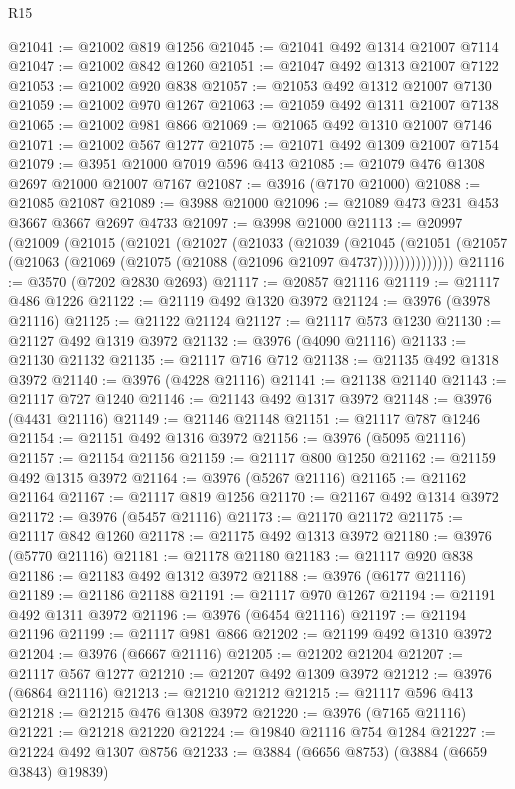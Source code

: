 \begin{lexlean}{R15}
\begin{coremodule}
@21041 := @21002 @819 @1256
@21045 := @21041 @492 @1314 @21007 @7114
@21047 := @21002 @842 @1260
@21051 := @21047 @492 @1313 @21007 @7122
@21053 := @21002 @920 @838
@21057 := @21053 @492 @1312 @21007 @7130
@21059 := @21002 @970 @1267
@21063 := @21059 @492 @1311 @21007 @7138
@21065 := @21002 @981 @866
@21069 := @21065 @492 @1310 @21007 @7146
@21071 := @21002 @567 @1277
@21075 := @21071 @492 @1309 @21007 @7154
@21079 := @3951 @21000 @7019 @596 @413
@21085 := @21079 @476 @1308 @2697 @21000 @21007 @7167
@21087 := @3916 (@7170 @21000)
@21088 := @21085 @21087
@21089 := @3988 @21000
@21096 := @21089 @473 @231 @453 @3667 @3667 @2697 @4733
@21097 := @3998 @21000
@21113 := @20997
    (@21009
      (@21015
        (@21021
          (@21027
            (@21033
              (@21039
                (@21045
                  (@21051 (@21057 (@21063 (@21069 (@21075 (@21088 (@21096 @21097 @4737))))))))))))))
@21116 := @3570 (@7202 @2830 @2693)
@21117 := @20857 @21116
@21119 := @21117 @486 @1226
@21122 := @21119 @492 @1320 @3972
@21124 := @3976 (@3978 @21116)
@21125 := @21122 @21124
@21127 := @21117 @573 @1230
@21130 := @21127 @492 @1319 @3972
@21132 := @3976 (@4090 @21116)
@21133 := @21130 @21132
@21135 := @21117 @716 @712
@21138 := @21135 @492 @1318 @3972
@21140 := @3976 (@4228 @21116)
@21141 := @21138 @21140
@21143 := @21117 @727 @1240
@21146 := @21143 @492 @1317 @3972
@21148 := @3976 (@4431 @21116)
@21149 := @21146 @21148
@21151 := @21117 @787 @1246
@21154 := @21151 @492 @1316 @3972
@21156 := @3976 (@5095 @21116)
@21157 := @21154 @21156
@21159 := @21117 @800 @1250
@21162 := @21159 @492 @1315 @3972
@21164 := @3976 (@5267 @21116)
@21165 := @21162 @21164
@21167 := @21117 @819 @1256
@21170 := @21167 @492 @1314 @3972
@21172 := @3976 (@5457 @21116)
@21173 := @21170 @21172
@21175 := @21117 @842 @1260
@21178 := @21175 @492 @1313 @3972
@21180 := @3976 (@5770 @21116)
@21181 := @21178 @21180
@21183 := @21117 @920 @838
@21186 := @21183 @492 @1312 @3972
@21188 := @3976 (@6177 @21116)
@21189 := @21186 @21188
@21191 := @21117 @970 @1267
@21194 := @21191 @492 @1311 @3972
@21196 := @3976 (@6454 @21116)
@21197 := @21194 @21196
@21199 := @21117 @981 @866
@21202 := @21199 @492 @1310 @3972
@21204 := @3976 (@6667 @21116)
@21205 := @21202 @21204
@21207 := @21117 @567 @1277
@21210 := @21207 @492 @1309 @3972
@21212 := @3976 (@6864 @21116)
@21213 := @21210 @21212
@21215 := @21117 @596 @413
@21218 := @21215 @476 @1308 @3972
@21220 := @3976 (@7165 @21116)
@21221 := @21218 @21220
@21224 := @19840 @21116 @754 @1284
@21227 := @21224 @492 @1307 @8756
@21233 := @3884 (@6656 @8753) (@3884 (@6659 @3843) @19839)

\end{coremodule}
\end{lexlean}
